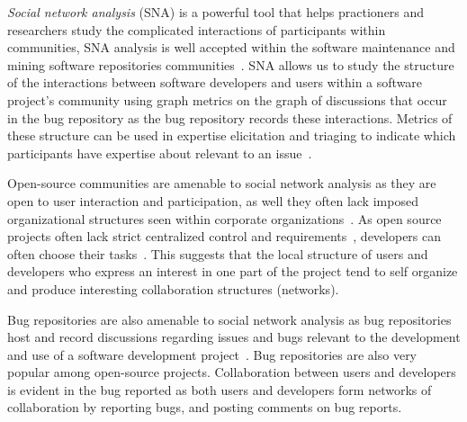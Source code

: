 \documentclass[10pt, conference, compsocconf]{IEEEtran}
\begin{document}
\label{introduction}



\emph{Social network analysis} (SNA) is a powerful tool that helps
practioners and researchers study the complicated interactions of
participants within communities, SNA analysis is well accepted within
the software maintenance and mining software repositories
communities~\cite{ACM:chris,MSR:christ,ICSEsocio:meneely}.  
%
SNA allows us to study the structure of the interactions between
software developers and users within a software project's community
using graph metrics on the graph of discussions that occur in the bug
repository as the bug repository records these interactions.
%
Metrics of these structure can be used in expertise elicitation and
triaging to indicate which  participants have expertise about relevant
to an issue~\cite{ICSEsocio:meneely}.


Open-source communities are amenable to social network analysis as
they are
open to user interaction and participation, as well they often lack imposed organizational
structures seen within corporate organizations~\cite{ACM:chris}.
As open source projects often lack strict centralized control and
requirements~\cite{AMCIS:Freeh}, developers can often choose their
tasks~\cite{ACM:ashish}. 
This suggests that the local structure of users and developers
who express an interest in one part of the project tend to self
organize and produce interesting collaboration structures (networks).


Bug repositories are also amenable to social network analysis as bug
repositories host and record discussions regarding issues and bugs relevant to
the development and use of a software development
project~\cite{ACM:ashish,OSD:yasu}. 
Bug repositories are also very popular among open-source projects.
Collaboration between users and developers is evident in the bug
reported as both users and developers form networks of collaboration
by reporting bugs, and posting comments
on bug reports.
\end{document}

